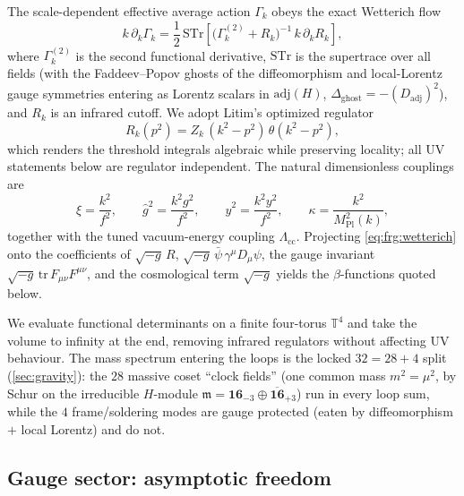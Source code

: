 The scale-dependent effective average action $\Gamma_{k}$ obeys the exact
Wetterich flow
\begin{equation}\label{eq:frg:wetterich}
  k\,\partial_{k}\Gamma_{k}
  =\frac12\,\mathrm{STr}\!\left[
    \bigl(\Gamma_{k}^{(2)}+R_{k}\bigr)^{-1}\,k\,\partial_{k}R_{k}\right],
\end{equation}
where $\Gamma_{k}^{(2)}$ is the second functional derivative, $\mathrm{STr}$
is the supertrace over all fields (with the Faddeev--Popov ghosts of the
diffeomorphism and local-Lorentz gauge symmetries entering as Lorentz
scalars in $\mathrm{adj}(H)$, $\Delta_{\mathrm{ghost}}=-(D_{\mathrm{adj}})^{2}$),
and $R_{k}$ is an infrared cutoff. We adopt Litim's optimized regulator
\begin{equation}\label{eq:frg:litim}
  R_{k}(p^{2})=Z_{k}\,(k^{2}-p^{2})\,\theta(k^{2}-p^{2}),
\end{equation}
which renders the threshold integrals algebraic while preserving locality;
all UV statements below are regulator independent. The natural
dimensionless couplings are
\begin{equation}\label{eq:frg:couplings}
  \xi=\frac{k^{2}}{f^{2}},\qquad
  \hat g^{2}=\frac{k^{2}g^{2}}{f^{2}},\qquad
  \hat y^{2}=\frac{k^{2}y^{2}}{f^{2}},\qquad
  \kappa=\frac{k^{2}}{M_{\mathrm{Pl}}^{2}(k)},
\end{equation}
together with the tuned vacuum-energy coupling $\Lambda_{\mathrm{cc}}$.
Projecting \eqref{eq:frg:wetterich} onto the coefficients of
$\sqrt{-g}\,R$, $\sqrt{-g}\,\bar\psi\,\gamma^{\mu}D_{\mu}\psi$, the gauge
invariant $\sqrt{-g}\,\mathrm{tr}\,F_{\mu\nu}F^{\mu\nu}$, and the cosmological
term $\sqrt{-g}$ yields the $\beta$-functions quoted below.

\begin{remark}
We evaluate functional determinants on a finite four-torus $\mathbb{T}^{4}$
and take the volume to infinity at the end, removing infrared regulators
without affecting UV behaviour. The mass spectrum entering the loops is the
locked $32=28+4$ split (\autoref{sec:gravity}): the $28$ massive coset
``clock fields'' (one common mass $m^{2}=\mu^{2}$, by Schur on the
irreducible $H$-module $\mathfrak{m}=\mathbf{16}_{-3}\oplus\overline{\mathbf{16}}_{+3}$)
run in every loop sum, while the $4$ frame/soldering modes are gauge
protected (eaten by diffeomorphism $+$ local Lorentz) and do not.
\end{remark}

\subsection{Gauge sector: asymptotic freedom}
\label{sec:frg:gauge}

